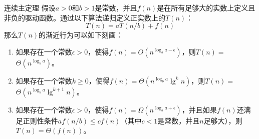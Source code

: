 \documentclass[lang=cn,newtx,10pt,scheme=chinese]{elegantbook}
\begin{document}
\begin{theorem}{连续主定理}{}
假设$a>0$和$b>1$是常数，并且$f(n)$是在所有足够大的实数上定义且非负的驱动函数。通过以下算法递归定义正实数上的$T(n)$：
$$
T(n)=a T(n / b)+f(n)
$$
那么$T(n)$的渐近行为可以如下刻画：
\begin{enumerate}
\item 如果存在一个常数$\epsilon>0$，使得$f(n)=O\left(n^{\log _b a-\epsilon}\right)$，则$T(n)=$ $\Theta\left(n^{\log _b a}\right)$。
\item 如果存在一个常数$k \geq 0$，使得$f(n)=\Theta\left(n^{\log _b a} \lg ^k n\right)$，则$T(n)=$ $\Theta\left(n^{\log _b a} \lg ^{k+1} n\right)$。
\item 如果存在一个常数$\epsilon>0$，使得$f(n)=\Omega\left(n^{\log _b a+\epsilon}\right)$，并且如果$f(n)$还满足正则性条件$a f(n / b) \leq c f(n)$（其中$c<1$是常数，并且$n$足够大），则$T(n)=\Theta(f(n))$。
\end{enumerate}
\end{theorem}
\end{document}
